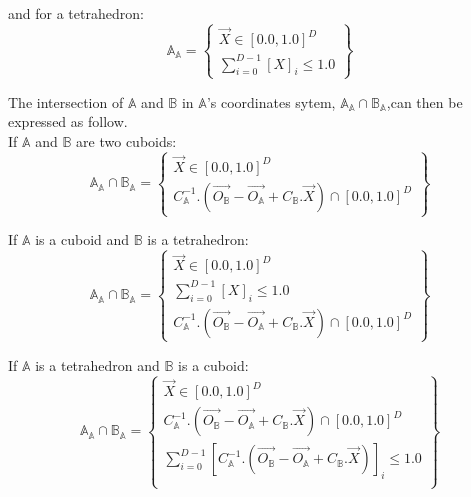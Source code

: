 \documentclass[12pt, a4paper]{article}
\begin{document}
and for a tetrahedron:
\begin{equation}
\mathbb{A}_\mathbb{A}=\left\lbrace
\begin{array}{c}
\overrightarrow{X}\in[0.0,1.0]^D\\
\sum_{i=0}^{D-1}\left[X\right]_i\le1.0
\end{array}
\right\rbrace
\end{equation}

The intersection of $\mathbb{A}$ and $\mathbb{B}$ in $\mathbb{A}$'s coordinates sytem, $\mathbb{A}_\mathbb{A}\cap\mathbb{B}_\mathbb{A}$,can then be expressed as follow.\\

If $\mathbb{A}$ and $\mathbb{B}$ are two cuboids:
\begin{equation}
\mathbb{A}_\mathbb{A}\cap\mathbb{B}_\mathbb{A}=\left\lbrace
\begin{array}{c}
\overrightarrow{X}\in[0.0,1.0]^D\\
C_\mathbb{A}^{-1}.\left(\overrightarrow{O_\mathbb{B}}-\overrightarrow{O_\mathbb{A}}+C_\mathbb{B}.\overrightarrow{X}\right)\cap[0.0,1.0]^D
\end{array}
\right\rbrace
\end{equation}

If $\mathbb{A}$ is a cuboid and $\mathbb{B}$ is a tetrahedron:
\begin{equation}
\mathbb{A}_\mathbb{A}\cap\mathbb{B}_\mathbb{A}=\left\lbrace
\begin{array}{c}
\overrightarrow{X}\in[0.0,1.0]^D\\
\sum_{i=0}^{D-1}\left[X\right]_i\le1.0\\
C_\mathbb{A}^{-1}.\left(\overrightarrow{O_\mathbb{B}}-\overrightarrow{O_\mathbb{A}}+C_\mathbb{B}.\overrightarrow{X}\right)\cap[0.0,1.0]^D
\end{array}
\right\rbrace
\end{equation}

If $\mathbb{A}$ is a tetrahedron and $\mathbb{B}$ is a cuboid:
\begin{equation}
\mathbb{A}_\mathbb{A}\cap\mathbb{B}_\mathbb{A}=\left\lbrace
\begin{array}{c}
\overrightarrow{X}\in[0.0,1.0]^D\\
C_\mathbb{A}^{-1}.\left(\overrightarrow{O_\mathbb{B}}-\overrightarrow{O_\mathbb{A}}+C_\mathbb{B}.\overrightarrow{X}\right)\cap[0.0,1.0]^D\\
\sum_{i=0}^{D-1}\left[C_\mathbb{A}^{-1}.\left(\overrightarrow{O_\mathbb{B}}-\overrightarrow{O_\mathbb{A}}+C_\mathbb{B}.\overrightarrow{X}\right)\right]_i\le1.0\\
\end{array}
\right\rbrace
\end{equation}
\end{document}
